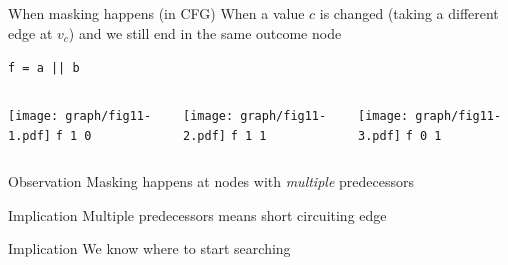 \documentclass[xcolor = {dvipsnames, table}]{beamer}
\begin{document}
\begin{frame}[fragile]
    \begin{block}{When masking happens (in CFG)}
        When a value $c$ is changed (taking a different edge at $v_c$) and
        we still end in the same outcome node
    \end{block}

    \lstinline{f = a || b}

    \begin{columns}
        \begin{column}{0.3\textwidth}
            \centering
            \texttt{[image: graph/fig11-1.pdf]}
            \lstinline{f 1 0}
        \end{column}

        \begin{column}{0.3\textwidth}
            \centering
            \texttt{[image: graph/fig11-2.pdf]}
            \lstinline{f 1 1}
        \end{column}

        \begin{column}{0.3\textwidth}
            \centering
            \texttt{[image: graph/fig11-3.pdf]}
        \lstinline{f 0 1}
        \end{column}
    \end{columns}
\end{frame}

\begin{frame}
    \begin{block}{Observation}
        Masking happens at nodes with \emph{multiple} predecessors
    \end{block}

    \begin{block}{Implication}
        Multiple predecessors means short circuiting edge
    \end{block}

    \begin{block}{Implication}
        We know where to start searching
    \end{block}
\end{frame}
\end{document}
